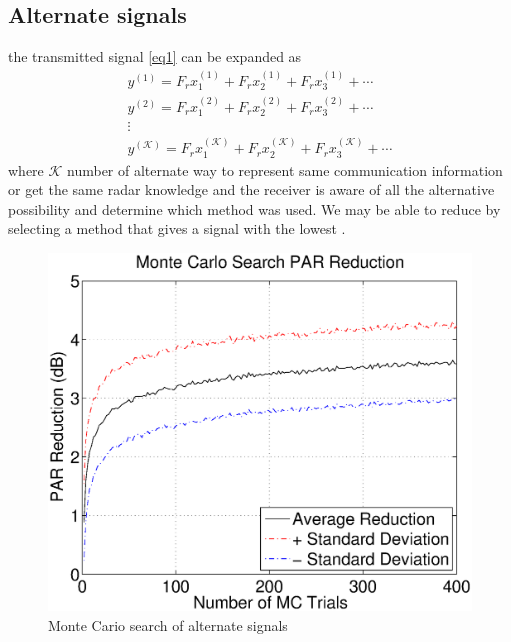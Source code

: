 \documentclass[conference]{IEEEtran}
\begin{document}
\subsection{Alternate signals}
the transmitted signal \eqref{eq1} can be expanded as
\begin{gather*}
y^{(1)}=F_rx_1^{(1)}+F_rx_2^{(1)}+F_rx_3^{(1)}+\cdots \\
y^{(2)}=F_rx_1^{(2)}+F_rx_2^{(2)}+F_rx_3^{(2)}+\cdots \\
\vdots \\
y^{(\mathcal{K})}=F_rx_1^{(\mathcal{K})}+F_rx_2^{(\mathcal{K})}+F_rx_3^{(\mathcal{K})}+\cdots
\end{gather*}
where $\mathcal{K}$ number of alternate way to represent same communication information or get the same radar knowledge and the receiver is aware of all the alternative possibility and determine which method was used.  We may be able to reduce \PAR by selecting a method that gives a signal with the lowest \PAR.  
\begin{figure}
\includegraphics[width=\linewidth]{MCFig.eps}
\caption{Monte Cario search of alternate signals}
\end{figure}





\end{document}
